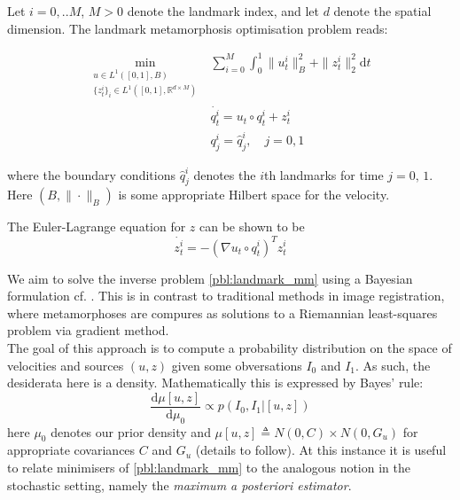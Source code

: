 \documentclass{article}
\newcommand{\dd}[2]{\frac{\diff#1}{\diff#2}}
\newcommand{\norm}[2]{\| #1 \|_{ #2 }}
\newcommand{\bnorm}[1]{\norm{ #1 }{B}}
\newcommand{\ltwonorm}[1]{\norm{ #1 }{2}}
\newcommand{\diff}[1]{\text{d} #1}
\begin{document}
Let $i=0,..M$, $M>0$ denote the landmark index, and let $d$ denote the spatial
dimension. The landmark metamorphosis optimisation problem reads:

\begin{subequations}\label{pbl:landmark_mm}
\begin{align}
\min_{\substack{u\in L^1([0,1],B)\\ \{z^i_t\}_i \in L^1([0,1],\mathbb{R}^{d\times M})}} &
\sum_{i=0}^M \int_0^1 \bnorm{u^i_t}^2 + \ltwonorm{z^i_t}^2 \diff{t}\\
            & \dot{q^i_t} = u_t \circ q^i_t + z^i_t \label{eq:ele_q} \\
            & q^i_j = \hat q^i_j, \quad j=0,1 \label{eq:ele_q_bcs}
\end{align}
\end{subequations}

where the boundary conditions $\hat q^i_j$ denotes the $i$th landmarks for time
$j=0,\,1$. Here $(B,\bnorm{\cdot})$ is some appropriate Hilbert space for the
velocity.

The Euler-Lagrange equation for $z$ can be shown to be
\begin{equation}\label{eq:ele_z}
\dot{z^i_t} = - (\nabla u_t \circ q^i_t)^T z^i_t
\end{equation}

We aim to solve the inverse problem \eqref{pbl:landmark_mm} using a Bayesian
formulation cf. \cite{dashti2017bayesian,dashti2013map}. This is in contrast to
traditional methods in image registration, where metamorphoses are compures as
solutions to a Riemannian least-squares problem via gradient method.\\

The goal of this approach is to compute a probability distribution on the space
of velocities and sources $(u,z)$ given some obversations $I_0$ and $I_1$. As
such, the desiderata here is a density. Mathematically this is expressed by
Bayes' rule:
\[
\dd{\mu[u,z]}{\mu_0} \propto p(I_0, I_1 | [u, z])
\]
here $\mu_0$ denotes our prior density and $\mu[u, z] \triangleq N(0,C)\times
N(0,G_u)$ for appropriate covariances $C$ and $G_u$ (details to follow). At this
instance it is useful to relate minimisers of \eqref{pbl:landmark_mm} to the
analogous notion in the stochastic setting, namely the \textit{maximum a
posteriori estimator}.
\end{document}

